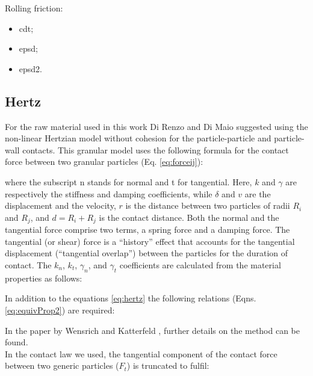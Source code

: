 Rolling friction:
\begin{itemize}
  \item{cdt;}
  \item{epsd;}
  \item{epsd2.}
\end{itemize}


\subsection{Hertz}
\label{subsec:hertz}

For the raw material used in this work 
Di Renzo and Di Maio \cite{RefWorks:145} suggested using the non-linear
Hertzian model without cohesion for the particle-particle and particle-wall contacts. 
This granular model uses the following formula for the contact force between two granular particles (Eq. \ref{eq:forceij}):

where the subscript \acs{n} stands for normal and \acs{t} for tangential. 
Here, $k$ and $\gamma$ are respectively the stiffness and damping coefficients, 
while $\delta$ and $v$ are the displacement and the velocity, $r$ is the
distance between two particles of radii $R_i$ and $R_j$, and $d = R_i + R_j $ is
the contact distance.
Both the normal and the tangential
force comprise two terms, a spring force and a damping force. 
The tangential (or shear) force is a ``history'' effect that accounts for the
tangential displacement (``tangential overlap'') between the particles for the
duration of contact.
The $k_n$, $k_t$, $\gamma_n$, and $\gamma_t$ coefficients are calculated from
the material properties as follows:

In addition to the equations \ref{eq:hertz} the following relations (Eqns. \ref{eq:equivProp2}) are required:


In the paper by Wensrich and Katterfeld \cite{RefWorks:87}, further details on
the method can be found.\\
In the contact law we used, 
the tangential component of the contact force between two generic particles
($F_t$) is truncated to fulfil:


